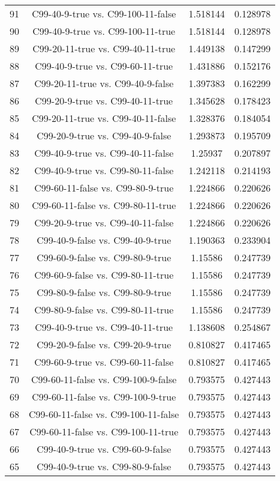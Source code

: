 \documentclass[a4paper,10pt]{article}
\begin{document}
\begin{landscape}
\begin{table}[!htp]
\begin{tabular}{cccc}
91&C99-40-9-true vs. C99-100-11-false&1.518144&0.128978\\
90&C99-40-9-true vs. C99-100-11-true&1.518144&0.128978\\
89&C99-20-11-true vs. C99-40-11-true&1.449138&0.147299\\
88&C99-40-9-true vs. C99-60-11-true&1.431886&0.152176\\
87&C99-20-11-true vs. C99-40-9-false&1.397383&0.162299\\
86&C99-20-9-true vs. C99-40-11-true&1.345628&0.178423\\
85&C99-20-11-true vs. C99-40-11-false&1.328376&0.184054\\
84&C99-20-9-true vs. C99-40-9-false&1.293873&0.195709\\
83&C99-40-9-true vs. C99-40-11-false&1.25937&0.207897\\
82&C99-40-9-true vs. C99-80-11-false&1.242118&0.214193\\
81&C99-60-11-false vs. C99-80-9-true&1.224866&0.220626\\
80&C99-60-11-false vs. C99-80-11-true&1.224866&0.220626\\
79&C99-20-9-true vs. C99-40-11-false&1.224866&0.220626\\
78&C99-40-9-false vs. C99-40-9-true&1.190363&0.233904\\
77&C99-60-9-false vs. C99-80-9-true&1.15586&0.247739\\
76&C99-60-9-false vs. C99-80-11-true&1.15586&0.247739\\
75&C99-80-9-false vs. C99-80-9-true&1.15586&0.247739\\
74&C99-80-9-false vs. C99-80-11-true&1.15586&0.247739\\
73&C99-40-9-true vs. C99-40-11-true&1.138608&0.254867\\
72&C99-20-9-false vs. C99-20-9-true&0.810827&0.417465\\
71&C99-60-9-true vs. C99-60-11-false&0.810827&0.417465\\
70&C99-60-11-false vs. C99-100-9-false&0.793575&0.427443\\
69&C99-60-11-false vs. C99-100-9-true&0.793575&0.427443\\
68&C99-60-11-false vs. C99-100-11-false&0.793575&0.427443\\
67&C99-60-11-false vs. C99-100-11-true&0.793575&0.427443\\
66&C99-40-9-true vs. C99-60-9-false&0.793575&0.427443\\
65&C99-40-9-true vs. C99-80-9-false&0.793575&0.427443\\

\end{tabular}
\end{table}
\end{landscape}
\end{document}
